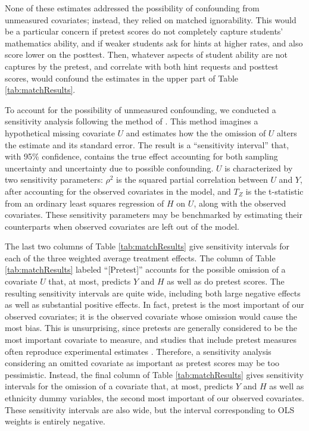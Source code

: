 \documentclass{article}\usepackage[]{graphicx}\usepackage[]{color}
\begin{document}
None of these estimates addressed the possibility of confounding from
unmeasured covariates; instead, they relied on matched ignorability.
This would be a particular concern if pretest scores do not completely
capture students' mathematics ability, and if weaker students ask for hints at
higher rates, and also score lower on the posttest.
Then, whatever aspects of student ability are not captures by the
pretest, and correlate with both hint requests and posttest scores,
would confound the estimates in the upper part of Table
\ref{tab:matchResults}.

To account for the possibility of unmeasured confounding, we conducted
a sensitivity analysis following the method of \citet{hhh}.
This method imagines a hypothetical missing covariate $U$ and estimates
how the the omission of $U$ alters the estimate
and its standard error.
The result is a ``sensitivity interval'' \citep[c.f.][]{rosenbaum2002observational} that,
with 95\% confidence, contains the true effect accounting for both
sampling uncertainty and uncertainty due to possible confounding.
$U$ is characterized by two sensitivity parameters:
$\rho^2$ is the squared partial correlation between $U$ and $Y$, after
accounting for the observed covariates in the model, and $T_Z$ is the
t-statistic from an ordinary least squares regression of $H$ on $U$, along with the observed covariates.
These sensitivity parameters may be benchmarked by estimating their
counterparts when observed covariates are left out of the model.

The last two columns of Table \ref{tab:matchResults} give sensitivity intervals for each of the three weighted average treatment effects.
The column of Table \ref{tab:matchResults} labeled ``[Pretest]''
accounts for the possible omission of a covariate $U$ that, at most, predicts $Y$ and $H$ as well as do pretest scores.
The resulting sensitivity intervals are quite wide, including
both large negative effects as well as substantial positive
effects.
In fact, pretest is the most important of our observed covariates; it is the observed covariate whose omission would cause the most bias.
This is unsurprising, since pretests are generally considered to be the most important covariate to measure, and studies that include pretest measures often reproduce experimental estimates \citep[e.g.][]{cook2008three,cook2009bias}.
Therefore, a sensitivity analysis considering an omitted covariate as important as pretest scores may be too pessimistic.
Instead,
the final column of Table \ref{tab:matchResults} gives sensitivity intervals for the omission of a covariate that, at most, predicts $Y$ and $H$ as well as ethnicity dummy variables, the second most important of our observed covariates.
These sensitivity intervals are also wide, but the interval corresponding
to OLS weights is entirely negative.
\end{document}
